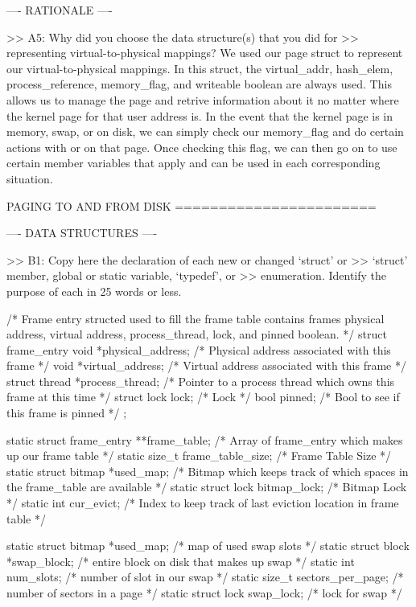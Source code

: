 ---- RATIONALE ----

>> A5: Why did you choose the data structure(s) that you did for
>> representing virtual-to-physical mappings?
We used our page struct to represent our virtual-to-physical mappings. In
this struct, the virtual_addr, hash_elem, process_reference, memory_flag, 
and writeable boolean are always used. This allows us to manage the page 
and retrive information about it no matter where the kernel page for that 
user address is. In the event that the kernel page is in memory, swap, or 
on disk, we can simply check our memory_flag and do certain actions with
or on that page. Once checking this flag, we can then go on to use certain 
member variables that apply and can be used in each corresponding
situation.

               PAGING TO AND FROM DISK
               =======================

---- DATA STRUCTURES ----

>> B1: Copy here the declaration of each new or changed `struct' or
>> `struct' member, global or static variable, `typedef', or
>> enumeration.  Identify the purpose of each in 25 words or less.

/* Frame entry structed used to fill the frame table 
contains frames physical address, virtual address,
process_thread, lock, and pinned boolean. */
struct frame_entry
{
    void *physical_address;         /* Physical address associated with this frame */
    void *virtual_address;          /* Virtual address associated with this frame */
    struct thread *process_thread;  /* Pointer to a process thread which owns this frame at this time */
    struct lock lock;               /* Lock */
    bool pinned;                    /* Bool to see if this frame is pinned */
};

static struct frame_entry **frame_table;    /* Array of frame_entry which makes up our frame table */
static size_t frame_table_size;             /* Frame Table Size */
static struct bitmap *used_map;             /* Bitmap which keeps track of which spaces in the frame_table are available */
static struct lock bitmap_lock;             /* Bitmap Lock */
static int cur_evict;                       /* Index to keep track of last eviction location in frame table */

static struct bitmap *used_map;         /* map of used swap slots */
static struct block *swap_block;        /* entire block on disk that makes up swap */
static int num_slots;                   /* number of slot in our swap */
static size_t sectors_per_page;         /* number of sectors in a page */
static struct lock swap_lock;           /* lock for swap */


